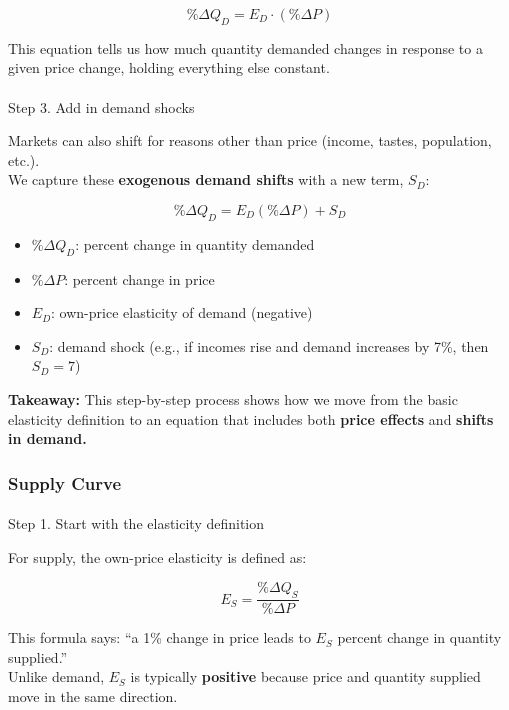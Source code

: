 \documentclass[
  letterpaper,
  DIV=11,
  numbers=noendperiod]{scrartcl}
\makeatletter
\let\oldparagraph\paragraph
\renewcommand{\paragraph}{
    \@ifstar
      \xxxParagraphStar
      \xxxParagraphNoStar
  }
\newcommand{\xxxParagraphStar}[1]{\oldparagraph*{#1}\mbox{}}
\newcommand{\xxxParagraphNoStar}[1]{\oldparagraph{#1}\mbox{}}
\providecommand{\tightlist}{%
  \setlength{\itemsep}{0pt}\setlength{\parskip}{0pt}}
\makeatother
\begin{document}
\[
\% \Delta Q_D = E_D \cdot (\% \Delta P)
\]

This equation tells us how much quantity demanded changes in response to
a given price change, holding everything else constant.

\paragraph{Step 3. Add in demand
shocks}\label{step-3.-add-in-demand-shocks}

Markets can also shift for reasons other than price (income, tastes,
population, etc.).\\
We capture these \textbf{exogenous demand shifts} with a new term,
\(S_D\):

\[
\% \Delta Q_D = E_D (\% \Delta P) + S_D
\]

\begin{itemize}
\tightlist
\item
  \(\% \Delta Q_D\): percent change in quantity demanded\\
\item
  \(\% \Delta P\): percent change in price\\
\item
  \(E_D\): own-price elasticity of demand (negative)\\
\item
  \(S_D\): demand shock (e.g., if incomes rise and demand increases by
  7\%, then \(S_D = 7\))
\end{itemize}

\textbf{Takeaway:} This step-by-step process shows how we move from the
basic elasticity definition to an equation that includes both
\textbf{price effects} and \textbf{shifts in demand.}

\subsubsection{Supply Curve}\label{supply-curve}

\paragraph{Step 1. Start with the elasticity
definition}\label{step-1.-start-with-the-elasticity-definition-1}

For supply, the own-price elasticity is defined as:

\[
E_S = \frac{\% \Delta Q_S}{\% \Delta P}
\]

This formula says: ``a 1\% change in price leads to \(E_S\) percent
change in quantity supplied.''\\
Unlike demand, \(E_S\) is typically \textbf{positive} because price and
quantity supplied move in the same direction.
\end{document}
